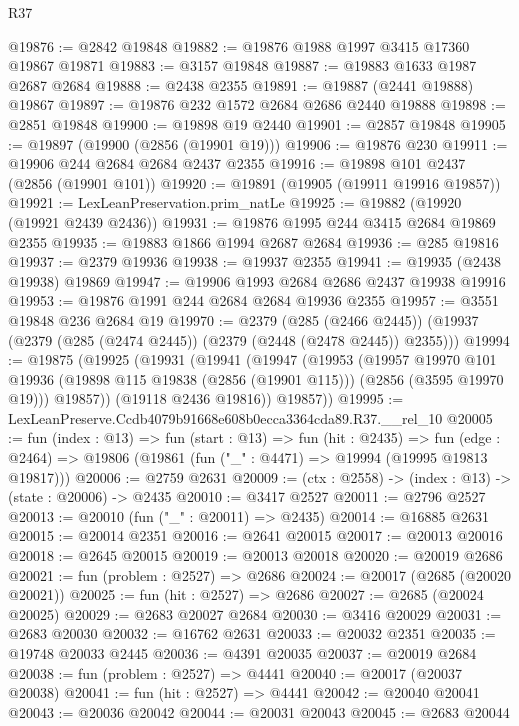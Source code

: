 \begin{lexlean}{R37}
\begin{coremodule}
@19876 := @2842 @19848
@19882 := @19876 @1988 @1997 @3415 @17360 @19867 @19871
@19883 := @3157 @19848
@19887 := @19883 @1633 @1987 @2687 @2684
@19888 := @2438 @2355
@19891 := @19887 (@2441 @19888) @19867
@19897 := @19876 @232 @1572 @2684 @2686 @2440 @19888
@19898 := @2851 @19848
@19900 := @19898 @19 @2440
@19901 := @2857 @19848
@19905 := @19897 (@19900 (@2856 (@19901 @19)))
@19906 := @19876 @230
@19911 := @19906 @244 @2684 @2684 @2437 @2355
@19916 := @19898 @101 @2437 (@2856 (@19901 @101))
@19920 := @19891 (@19905 (@19911 @19916 @19857))
@19921 := LexLeanPreservation.prim_natLe
@19925 := @19882 (@19920 (@19921 @2439 @2436))
@19931 := @19876 @1995 @244 @3415 @2684 @19869 @2355
@19935 := @19883 @1866 @1994 @2687 @2684
@19936 := @285 @19816
@19937 := @2379 @19936
@19938 := @19937 @2355
@19941 := @19935 (@2438 @19938) @19869
@19947 := @19906 @1993 @2684 @2686 @2437 @19938 @19916
@19953 := @19876 @1991 @244 @2684 @2684 @19936 @2355
@19957 := @3551 @19848 @236 @2684 @19
@19970 := @2379
    (@285 (@2466 @2445))
    (@19937 (@2379 (@285 (@2474 @2445)) (@2379 (@2448 (@2478 @2445)) @2355)))
@19994 := @19875
    (@19925
      (@19931
        (@19941
          (@19947
            (@19953
              (@19957
                @19970
                @101
                @19936
                (@19898 @115 @19838 (@2856 (@19901 @115)))
                (@2856 (@3595 @19970 @19)))
              @19857))
          (@19118 @2436 @19816))
        @19857))
@19995 := LexLeanPreserve.Ccdb4079b91668e608b0ecca3364cda89.R37.__rel_10
@20005 := fun (index : @13) =>
  fun (start : @13) =>
  fun (hit : @2435) =>
  fun (edge : @2464) => @19806 (@19861 (fun ("_" : @4471) => @19994 (@19995 @19813 @19817)))
@20006 := @2759 @2631
@20009 := (ctx : @2558) -> (index : @13) -> (state : @20006) -> @2435
@20010 := @3417 @2527
@20011 := @2796 @2527
@20013 := @20010 (fun ("_" : @20011) => @2435)
@20014 := @16885 @2631
@20015 := @20014 @2351
@20016 := @2641 @20015
@20017 := @20013 @20016
@20018 := @2645 @20015
@20019 := @20013 @20018
@20020 := @20019 @2686
@20021 := fun (problem : @2527) => @2686
@20024 := @20017 (@2685 (@20020 @20021))
@20025 := fun (hit : @2527) => @2686
@20027 := @2685 (@20024 @20025)
@20029 := @2683 @20027 @2684
@20030 := @3416 @20029
@20031 := @2683 @20030
@20032 := @16762 @2631
@20033 := @20032 @2351
@20035 := @19748 @20033 @2445
@20036 := @4391 @20035
@20037 := @20019 @2684
@20038 := fun (problem : @2527) => @4441
@20040 := @20017 (@20037 @20038)
@20041 := fun (hit : @2527) => @4441
@20042 := @20040 @20041
@20043 := @20036 @20042
@20044 := @20031 @20043
@20045 := @2683 @20044

\end{coremodule}
\end{lexlean}
